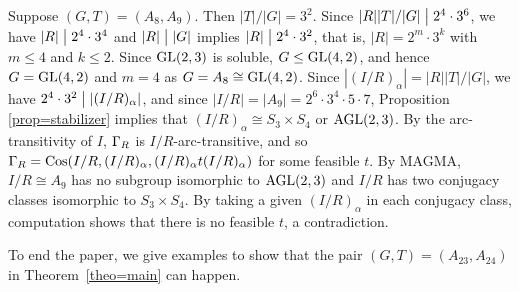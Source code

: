 \documentclass[12pt]{article}
\def\a{\alpha} \def\b{\beta} \def\g{\gamma} \def\d{\delta} \def\e{\varepsilon}
\def\di{\bigm|} \def\lg{\langle} \def\rg{\rangle}
\def\Cos{\hbox{\rm Cos}}
\newcommand{\qed}{\mbox{\raisebox{0.7ex}{\fbox{}}} \vspace{4truemm}}
\begin{document}
Suppose $(G,T)=(A_8,A_9)$. Then $|T|/|G|=3^2$. Since $|R||T|/|G|\di 2^4\cdot3^6$, we have $|R|\di 2^4\cdot 3^4$ and $|R|\di |G|$ implies $|R|\di 2^4\cdot3^2$, that is, $|R|=2^m\cdot 3^k$ with $m\leq 4$ and $k\leq 2$.
Since $\hbox{\rm GL}(2,3)$ is soluble, $G\leq \hbox{\rm GL}(4,2)$, and hence $G=\hbox{\rm GL}(4,2)$ and $m=4$ as $G=A_8\cong \hbox{\rm GL}(4,2)$. Since
$|(I/R)_\a|=|R||T|/|G|$, we have $2^4\cdot 3^2\di|(I/R)_\a|$, and since $|I/R|=|A_9|=2^6\cdot3^4\cdot5\cdot7$, Proposition \ref{prop=stabilizer} implies that $(I/R)_\a\cong S_3\times S_4$ or $\rm AGL(2,3)$. By the arc-transitivity of $I$, $\Gamma_R$ is $I/R$-arc-transitive, and so $\G_R=\Cos(I/R,(I/R)_\a , (I/R)_\a t (I/R)_\a)$ for some feasible $t$.
By MAGMA, $I/R\cong A_9$ has no subgroup isomorphic to $\rm AGL(2,3)$ and $I/R$ has two conjugacy classes isomorphic to $S_3\times S_4$. By taking a given $(I/R)_\a$ in each conjugacy class, computation shows that there is no feasible $t$, a contradiction.

\hfill\qed

To end the paper, we give examples to show that the pair $(G,T)=(A_{23},A_{24})$ in Theorem~\ref{theo=main} can happen.
\end{document}
